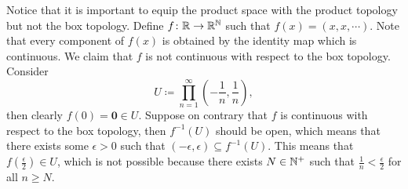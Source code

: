 \documentclass[math]{amznotes}
\theoremstyle{remark}
\begin{document}
Notice that it is important to equip the product space with the product topology but not the box topology. Define $f \colon \mathbb{R} \to \mathbb{R}^{\mathbb{N}}$ such that $f\left(x\right) = \left(x, x, \cdots\right)$. Note that every component of $f\left(x\right)$ is obtained by the identity map which is continuous. We claim that $f$ is not continuous with respect to the box topology. Consider 
\begin{equation*}
    U \coloneqq \prod_{n = 1}^{\infty}\left(-\frac{1}{n}, \frac{1}{n}\right),
\end{equation*}
then clearly $f\left(0\right) = \mathbf{0} \in U$. Suppose on contrary that $f$ is continuous with respect to the box topology, then $f^{-1}\left(U\right)$ should be open, which means that there exists some $\epsilon > 0$ such that $\left(-\epsilon, \epsilon\right) \subseteq f^{-1}\left(U\right)$. This means that $f\left(\frac{\epsilon}{2}\right) \in U$, which is not possible because there exists $N \in \mathbb{N}^+$ such that $\frac{1}{n} < \frac{\epsilon}{2}$ for all $n \geq N$.
\end{document}
